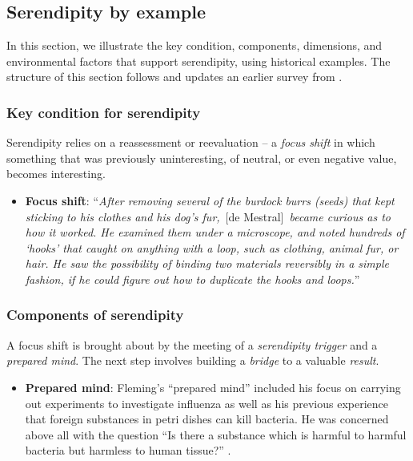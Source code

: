 \subsection{Serendipity by example} \label{sec:by-example}

In this section, we illustrate the key condition, components,
dimensions, and environmental factors that support serendipity, using
historical examples.  The structure of this section follows and
updates an earlier survey from .

\subsubsection*{Key condition for serendipity}

Serendipity relies on a reassessment or reevaluation -- a \emph{focus shift} in which something that was previously uninteresting, of neutral, or even negative value, becomes interesting.

\begin{itemize}
\item \textbf{Focus shift}: ``\emph{After removing several of the
  burdock burrs (seeds) that kept sticking to his clothes and his
  dog's fur,}~[de Mestral]~\emph{became curious as to how it
  worked. He examined them under a microscope, and noted hundreds of
  `hooks' that caught on anything with a loop, such as clothing,
  animal fur, or hair. He saw the possibility of binding two materials
  reversibly in a simple fashion, if he could figure out how to
  duplicate the hooks and loops.}''~\cite{wiki:velcro}
\end{itemize}

\subsubsection*{Components of serendipity}

A focus shift is brought about by the meeting of a \emph{serendipity trigger} and a \emph{prepared mind}.  The next step involves building a \emph{bridge} to a valuable \emph{result}.

\begin{itemize}
\item \textbf{Prepared mind}: 
Fleming's ``prepared mind'' included his focus
on carrying out experiments to investigate influenza as well as his
previous experience that foreign substances in petri dishes can kill
bacteria.  He was concerned above all with the question ``Is there a
substance which is harmful to harmful bacteria but harmless to human
tissue?''  \cite[p. 161]{roberts}.
\end{itemize}

